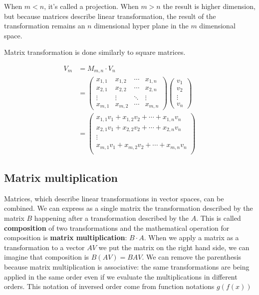 When \(m < n\), it's called a projection. When \(m > n\) the result is higher dimension, but because matrices describe linear transformation, the result of the transformation remains an \(n\) dimensional hyper plane in the \(m\) dimensional space.

Matrix transformation is done similarly to square matrices.

\[\begin{aligned}V_m &= M_{m,n} \cdot V_n \\ &= \begin{pmatrix}
  x_{1,1} & x_{1,2} & \cdots & x_{1,n} \\
  x_{2,1} & x_{2,2} & \cdots & x_{2,n} \\
  \vdots  & \vdots  & \ddots & \vdots  \\
  x_{m,1} & x_{m,2} & \cdots & x_{m,n}
 \end{pmatrix} \begin{pmatrix} v_1 \\ v_2 \\ \vdots \\ v_n \end{pmatrix} \\ &= \begin{pmatrix}
  x_{1,1} v_1 + x_{1,2} v_2 + \cdots + x_{1,n} v_n  \\
  x_{2,1} v_1 + x_{2,2} v_2 + \cdots + x_{2,n} v_n  \\
  \vdots \\
  x_{m,1} v_1 + x_{m,2} v_2 + \cdots + x_{m,n} v_n  \\
 \end{pmatrix}\end{aligned}\]

\subsection{Matrix multiplication}

Matrices, which describe linear transformations in vector spaces, can be combined. We can express as a single matrix the transformation described by the matrix \(B\) happening after a transformation described by the \(A\). This is called \textbf{composition} of two transformations and the mathematical operation for composition is \textbf{matrix multiplication}: \(B \cdot A\). When we apply a matrix as a transformation to a vector \(AV\) we put the matrix on the right hand side, we can imagine that composition is \(B(AV) = BAV\). We can remove the parenthesis because matrix multiplication is associative: the same transformations are being applied in the same order even if we evaluate the multiplications in different orders. This notation of inversed order come from function notations \(g(f(x))\)

